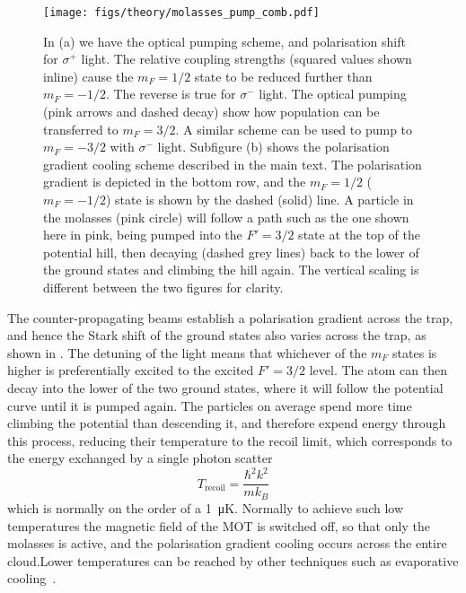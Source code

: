 \begin{figure}[htb]
  \centering
  \texttt{[image: figs/theory/molasses\_pump\_comb.pdf]}
    \caption[Subdoppler cooling]{
      In (a) we have the optical pumping scheme, and polarisation shift
      for $\sigma^+$ light. The relative coupling strengths (squared values
      shown inline) cause the $m_F=1/2$ state to be reduced further than
      $m_F=-1/2$.  The reverse is true for $\sigma^-$ light. The optical
      pumping (pink arrows and dashed decay) show how population can be
      transferred to $m_F=3/2$. A similar scheme can be used to pump to
      $m_F=-3/2$ with $\sigma^-$ light. Subfigure (b) shows the polarisation
      gradient cooling scheme described in the main text.  The polarisation
      gradient is depicted in the bottom row, and the $m_F=1/2$ ($m_F=-1/2$)
      state is shown by the dashed (solid) line. A particle in the molasses
      (pink circle) will follow a path such as the one shown here in pink,
      being pumped into the $F'=3/2$ state at the top of the potential hill,
      then decaying (dashed grey lines) back to the lower of the ground states
      and climbing the hill again. The vertical scaling is different between
      the two figures for clarity.
  }
  \label{theory:fig:subdoppler}
\end{figure}

The counter-propagating beams establish a polarisation gradient across the
trap, and hence the Stark shift of the ground states also varies across the
trap, as shown in . The detuning of the
light means that whichever of the $m_F$ states is higher is preferentially
excited to the excited $F'=3/2$ level.
%
The atom can then decay into the lower of the two ground states, where it
will follow the potential curve until it is pumped again. The particles on
average spend more time climbing the potential than descending it, and
therefore expend energy through this process, reducing their temperature to the
recoil limit, which corresponds to the energy exchanged by a single photon
scatter
%
\begin{equation}
  T_\text{recoil} = \frac{\hbar^2 k^2}{m k_B}
\end{equation}
%
which is normally on the order of a \SI{1}{\micro\kelvin}.  Normally to achieve
such low temperatures the magnetic field of the MOT is switched off, so that
only the molasses is active, and the polarisation gradient cooling occurs
across the entire cloud.Lower temperatures can be reached by other techniques
such as evaporative cooling~\cite{Metcalf1999}.


